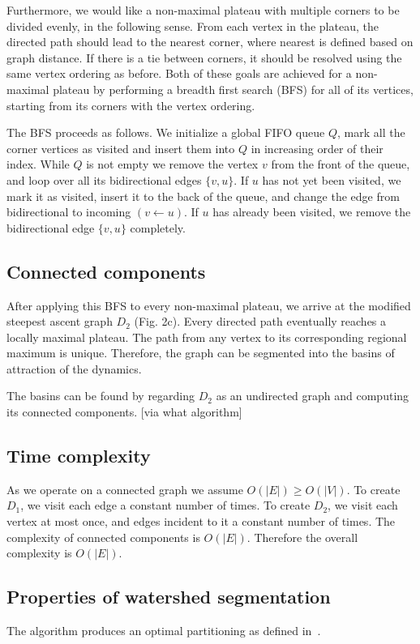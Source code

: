 \documentclass{article}
\begin{document}
Furthermore, we would like a non-maximal plateau with multiple corners
to be divided evenly, in the following sense.  From each vertex in the
plateau, the directed path should lead to the nearest corner, where
nearest is defined based on graph distance.  If there is a tie between
corners, it should be resolved using the same vertex ordering as
before.  Both of these goals are achieved for a non-maximal plateau by
performing a breadth first search (BFS) for all of its vertices,
starting from its corners with the vertex ordering.

The BFS proceeds as follows.  We initialize a global FIFO queue $Q$,
mark all the corner vertices as visited and insert them into $Q$ in
increasing order of their index. While $Q$ is not empty we remove the
vertex $v$ from the front of the queue, and loop over all its
bidirectional edges $\{v,u\}$.  If $u$ has not yet been visited, we
mark it as visited, insert it to the back of the queue, and change the
edge from bidirectional to incoming $(v\leftarrow u)$. If $u$ has
already been visited, we remove the bidirectional edge $\{v,u\}$
completely.

\subsection{Connected components}
After applying this BFS to every non-maximal plateau, we arrive at the
modified steepest ascent graph $D_2$ (Fig. 2c).  Every directed path eventually reaches a locally maximal plateau.  The path from any vertex to its corresponding regional maximum is unique.  Therefore, the graph can be segmented into the basins of attraction of the dynamics.

The basins can be found by regarding $D_2$ as an undirected graph and
computing its connected components.  [via what algorithm]

\subsection{Time complexity}
As we operate on a connected graph we assume $O(|E|) \ge O(|V|)$.  To
create $D_1$, we visit each edge a constant number of times. To create
$D_2$, we visit each vertex at most once, and edges incident to it a
constant number of times. The complexity of connected components is
$O(|E|)$.  Therefore the overall complexity is $O(|E|)$.

\subsection{Properties of watershed segmentation}
The algorithm produces an optimal partitioning as defined
in~\cite{Cousty2009}.
\end{document}
